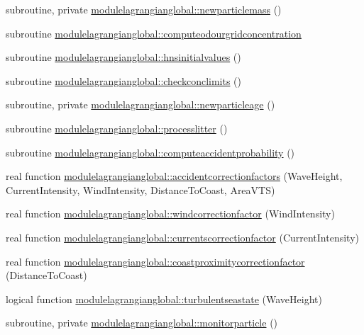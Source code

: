 \begin{DoxyCompactItemize}
subroutine, private \mbox{\hyperlink{namespacemodulelagrangianglobal_ab7a73b07470ae9858c75d8d622eabdff}{modulelagrangianglobal\+::newparticlemass}} ()
\item 
subroutine \mbox{\hyperlink{namespacemodulelagrangianglobal_ac0a32c3b1f02a2a6ba502620bfc58fa6}{modulelagrangianglobal\+::computeodourgridconcentration}}
\item 
subroutine \mbox{\hyperlink{namespacemodulelagrangianglobal_ad1111403d5d343cacd9cf3deb4c66ec9}{modulelagrangianglobal\+::hnsinitialvalues}} ()
\item 
subroutine \mbox{\hyperlink{namespacemodulelagrangianglobal_a787d28742cbd84ad7a607a488de397e2}{modulelagrangianglobal\+::checkconclimits}} ()
\item 
subroutine, private \mbox{\hyperlink{namespacemodulelagrangianglobal_aefd30b6e40fc0d2152594e910c0c05de}{modulelagrangianglobal\+::newparticleage}} ()
\item 
subroutine \mbox{\hyperlink{namespacemodulelagrangianglobal_ae943a682fa588e08202185a107d59f97}{modulelagrangianglobal\+::processlitter}} ()
\item 
subroutine \mbox{\hyperlink{namespacemodulelagrangianglobal_ab4d5d4f0cabe63a2e5fc1e9349f8425d}{modulelagrangianglobal\+::computeaccidentprobability}} ()
\item 
real function \mbox{\hyperlink{namespacemodulelagrangianglobal_afb914f24bcc861691825610d67c3f53d}{modulelagrangianglobal\+::accidentcorrectionfactors}} (Wave\+Height, Current\+Intensity, Wind\+Intensity, Distance\+To\+Coast, Area\+V\+TS)
\item 
real function \mbox{\hyperlink{namespacemodulelagrangianglobal_a69e5b3c9a0aabddfcaaf7e1b76623286}{modulelagrangianglobal\+::windcorrectionfactor}} (Wind\+Intensity)
\item 
real function \mbox{\hyperlink{namespacemodulelagrangianglobal_ad3e36abc135e62fb5fb1583ea3acf79b}{modulelagrangianglobal\+::currentscorrectionfactor}} (Current\+Intensity)
\item 
real function \mbox{\hyperlink{namespacemodulelagrangianglobal_a5ea7cad6f4171c5a773fbc1d09c57ebd}{modulelagrangianglobal\+::coastproximitycorrectionfactor}} (Distance\+To\+Coast)
\item 
logical function \mbox{\hyperlink{namespacemodulelagrangianglobal_a66539afef33f6cbf3d95ac82710bc7f9}{modulelagrangianglobal\+::turbulentseastate}} (Wave\+Height)
\item 
subroutine, private \mbox{\hyperlink{namespacemodulelagrangianglobal_a7e475a743774ea592904d34712f40255}{modulelagrangianglobal\+::monitorparticle}} ()

\end{DoxyCompactItemize}

